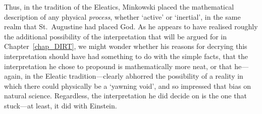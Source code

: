 Thus, in the tradition of the Eleatics, Minkowski placed the mathematical description of any physical \textit{process}, whether `active' or `inertial', in the same realm that St.~Augustine had placed God. As he appears to have realised roughly the additional possibility of the interpretation that will be argued for in Chapter~\ref{chap_DIRT}, we might wonder whether his reasons for decrying this interpretation should have had something to do with the simple facts, that the interpretation he chose to propound is mathematically more neat, or that he---again, in the Eleatic tradition---clearly abhorred the possibility of a reality in which there could physically be a `yawning void', and so impressed that bias on natural science. Regardless, the interpretation he did decide on is the one that stuck---at least, it did with Einstein.

